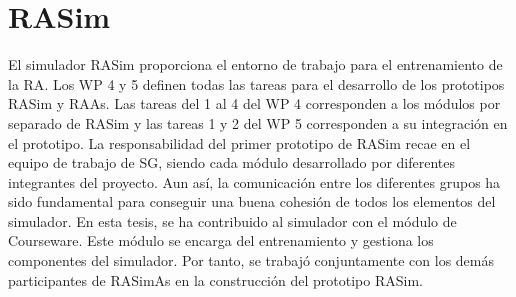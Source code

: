 \section{RASim}
\label{rasim:rasim}
El simulador \ac{RASim} proporciona el entorno de trabajo para el entrenamiento de la \ac{RA}.  
Los \ac{WP} 4 y 5 definen todas las tareas para el desarrollo de los prototipos \ac{RASim} y \ac{RAAs}. Las tareas del 1 al 4 del \ac{WP} 4 corresponden a los módulos por separado de \ac{RASim} y las tareas 1 y 2 del \ac{WP} 5 corresponden a su integración en el prototipo. 
La responsabilidad del primer prototipo de \ac{RASim} recae en el equipo de trabajo de \ac{SG}, siendo cada módulo desarrollado por diferentes integrantes del proyecto. Aun así, la comunicación entre los diferentes grupos ha sido fundamental para conseguir una buena cohesión de todos los elementos del simulador. En esta tesis, se ha contribuido al simulador con el módulo de \ac{Courseware}. Este módulo se encarga del entrenamiento y gestiona los componentes del simulador. Por tanto, se trabajó conjuntamente con los demás participantes de \ac{RASimAs} en la construcción del prototipo \ac{RASim}.




 


